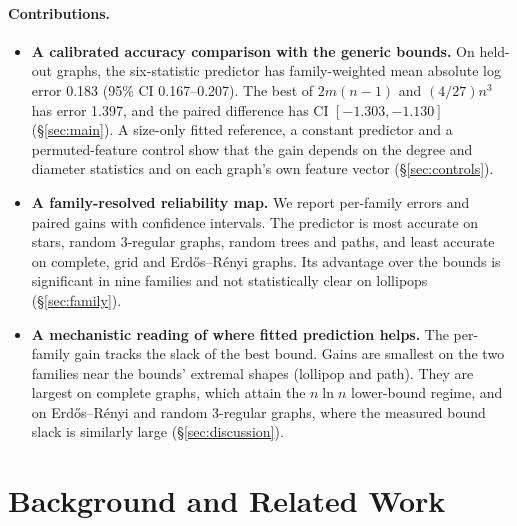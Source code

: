 \documentclass{article}
\begin{document}
\paragraph{Contributions.}
\begin{itemize}
\item \textbf{A calibrated accuracy comparison with the generic bounds.} On held-out graphs, the six-statistic predictor has family-weighted mean absolute log error 0.183 (95\% CI 0.167--0.207). The best of $2m(n-1)$ and $(4/27)n^3$ has error 1.397, and the paired difference has CI $[-1.303,-1.130]$ (\S\ref{sec:main}). A size-only fitted reference, a constant predictor and a permuted-feature control show that the gain depends on the degree and diameter statistics and on each graph's own feature vector (\S\ref{sec:controls}).
\item \textbf{A family-resolved reliability map.} We report per-family errors and paired gains with confidence intervals. The predictor is most accurate on stars, random 3-regular graphs, random trees and paths, and least accurate on complete, grid and Erd\H{o}s--R\'enyi graphs. Its advantage over the bounds is significant in nine families and not statistically clear on lollipops (\S\ref{sec:family}).
\item \textbf{A mechanistic reading of where fitted prediction helps.} The per-family gain tracks the slack of the best bound. Gains are smallest on the two families near the bounds' extremal shapes (lollipop and path). They are largest on complete graphs, which attain the $n\ln n$ lower-bound regime, and on Erd\H{o}s--R\'enyi and random 3-regular graphs, where the measured bound slack is similarly large (\S\ref{sec:discussion}).
\end{itemize}

\section{Background and Related Work}
\label{sec:related}
\end{document}
